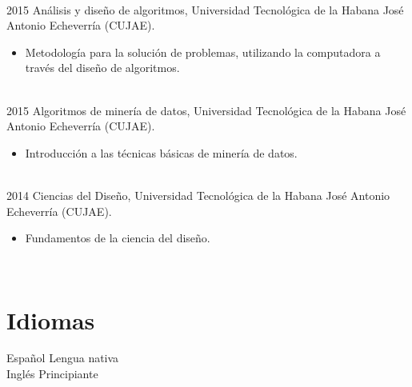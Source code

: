 \documentclass[letterpaper]{twentysecondcv} %
\begin{document}
\begin{twenty}
{        }
        \\
\twentyitem
    	{2015}
		{}
        {Análisis y diseño de algoritmos, Universidad Tecnológica de la Habana José Antonio
Echeverría (CUJAE).}
        {}
        {}
        {
        {\begin{itemize}
        \item Metodología para la solución de problemas, utilizando la computadora a través del diseño de algoritmos.
		\end{itemize}}
        }
        \\
\twentyitem
    	{2015}
		{}
        {Algoritmos de minería de datos, Universidad Tecnológica de la Habana José Antonio
Echeverría (CUJAE).}
        {}
        {}
        {
        {\begin{itemize}
        \item Introducción a las técnicas básicas de minería de datos.
		\end{itemize}}
        }
        \\
\twentyitem
    	{2014}
		{}
        {Ciencias del Diseño, Universidad Tecnológica de la Habana José Antonio
Echeverría (CUJAE).}
        {}
        {}
        {
        {\begin{itemize}
        \item Fundamentos de la ciencia del diseño.
		\end{itemize}}
        }


\end{twenty}

\pagebreak

\begin{twenty}
\twentyitem
    	{}
		{}
        {}
        {}
        {}
        {}
        \\
 \end{twenty} 

\section{Idiomas}

\begin{twenty} %
\twentyitem
    	{Español}
		{}
        {Lengua nativa}
        {}
        {}
        {}
        \\
	\twentyitem
    	{Inglés}
		{}
        {Principiante}
        {}
        {}
        {}


\end{twenty}
\end{document}
